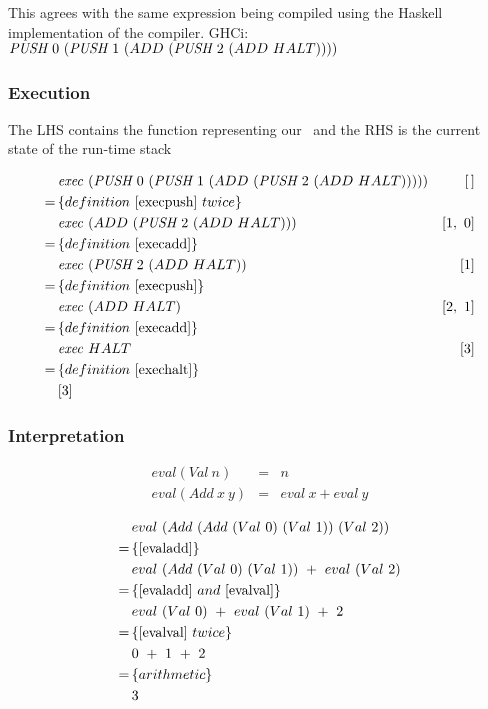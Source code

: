 \documentclass {article}
\begin{document}
This agrees with the same expression being compiled
using the Haskell implementation of the compiler.
GHCi: \( \textit{PUSH\ } 0\ (\textit{PUSH\ } 1\ (ADD\ (\textit{PUSH\ } 2\ (ADD\ HALT)))) \)

\subsubsection{Execution}

The LHS contains the function representing our \vm\
and the RHS is the current state of the run-time stack

\begin{align*}
&\Exec (\PUSH 0\ (\PUSH 1\ (ADD\ (\PUSH 2\ (ADD\ HALT))))) &[\, ] \\
=\, & \{ definition\ \ref{execpush}\ twice \} \\
&\Exec (ADD\ (\PUSH 2\ (ADD\ HALT))) 					&[1,\ 0] \\
=\, & \{ definition\ \ref{execadd} \} \\
&\Exec (\PUSH 2\ (ADD\ HALT)) 								&[1] \\
=\, & \{ definition\ \ref{execpush} \} \\
&\Exec (ADD\ HALT)										 &[2,\ 1] \\
=\, & \{ definition\ \ref{execadd} \} \\
&\Exec HALT 												&[3] \\
=\, & \{ definition\ \ref{exechalt} \} \\
&[3]
\end{align*}

\subsubsection{Interpretation}

\begin{eqnarray*}
	 eval (Val\  n) &=& n \\
	 eval (Add\  x\  y) &=& eval\  x + eval\  y 
\end{eqnarray*}

\begin{align*}
	&eval\ (Add\ (Add\ (Val\ 0)\ (Val\ 1))\ (Val\ 2)) \\
	=\, & \{ \ref{evaladd} \} \\
	&eval\ (Add\ (Val\ 0)\ (Val\ 1))\ +\ eval\ (Val\ 2) \\
	=\, & \{ \ref{evaladd}\ and\ \ref{evalval} \} \\
	&eval\ (Val\ 0)\ +\ eval\ (Val\ 1)\ +\ 2 \\
	=\, & \{ \ref{evalval}\ twice\} \\
	&0\ +\ 1\ +\ 2 \\
	=\, & \{ arithmetic \} \\
	&3
\end{align*}
\end{document}
